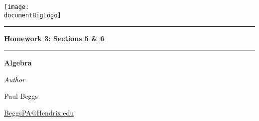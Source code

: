 \documentclass[12pt, oneside]{book}
\newcommand{\documentBigLogo}{../../images/logo_white_text.png}
\newcounter{BoxCounter}
\begin{document}



\newcommand{\assignmentname}{Homework 3: Sections 5 \& 6}

\newcommand{\cussubtitle}{Algebra}
\newcommand{\finaldate}{Septemeber 25, 2025}
\newcommand{\professor}{Dr. Christopher Camfield, Ph.D.}




\begin{titlepage}
    \begin{center}

        \vspace*{-2cm}
        \texttt{[image: \\documentBigLogo]}\\
        \vfill

        \textcolor{horange}{\rule{\textwidth}{1.0pt}}

        \vspace{2em}

        {\huge \textbf{\assignmentname}}

        \vspace{1em} %

        \textcolor{horange}{\rule{\textwidth}{1.0pt}}

        \vspace*{1\baselineskip}

        {\LARGE \textbf{\cussubtitle}}

        \begin{large}
            \vspace*{5\baselineskip}

            \vspace*{1\baselineskip}

            \emph{Author} \\[1ex]
            {\Large Paul Beggs \\ \par} %
            {\href{mailto:BeggsPA@Hendrix.edu}{{BeggsPA@Hendrix.edu}}}\\ %


\end{large}
\end{center}
\end{titlepage}
\end{document}
